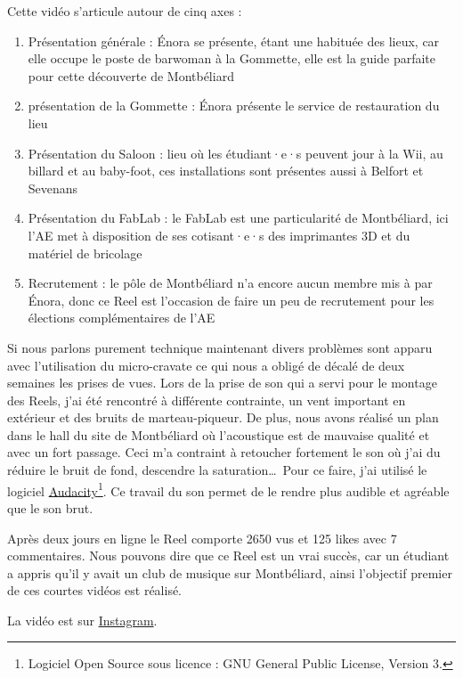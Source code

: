 Cette vidéo s'articule autour de cinq axes :
\begin{enumerate}
    \item Présentation générale : Énora se présente, étant une habituée des lieux, car elle occupe le poste de barwoman à la Gommette, elle est la guide parfaite pour cette découverte de Montbéliard
    \item présentation de la Gommette : Énora présente le service de restauration du lieu
    \item Présentation du Saloon : lieu où les étudiant·e·s peuvent jour à la Wii, au billard et au baby-foot, ces installations sont présentes aussi à Belfort et Sevenans
    \item Présentation du FabLab : le FabLab est une particularité de Montbéliard, ici l'\gls{AE} met à disposition de ses cotisant·e·s des imprimantes 3D et du matériel de bricolage
    \item Recrutement : le pôle de Montbéliard n'a encore aucun membre mis à par Énora, donc ce Reel est l'occasion de faire un peu de recrutement pour les élections complémentaires de l'\gls{AE}
\end{enumerate}


Si nous parlons purement technique maintenant divers problèmes sont apparu avec l'utilisation du micro-cravate ce qui nous a obligé de décalé de deux semaines les prises de vues.
Lors de la prise de son qui a servi pour le montage des Reels, j'ai été rencontré à différente contrainte, un vent important en extérieur et des bruits de marteau-piqueur.
De plus, nous avons réalisé un plan dans le hall du site de Montbéliard où l'acoustique est de mauvaise qualité et avec un fort passage.
Ceci m'a contraint à retoucher fortement le son où j'ai du réduire le bruit de fond, descendre la saturation\ldots\
Pour ce faire, j'ai utilisé le logiciel \href{https://www.audacityteam.org}{Audacity}\footnote{Logiciel Open Source sous licence : GNU General Public License, Version 3.}.
Ce travail du son permet de le rendre plus audible et agréable que le son brut.

Après deux jours en ligne le Reel comporte 2650 vus et 125 likes avec 7 commentaires.
Nous pouvons dire que ce Reel est un vrai succès, car un étudiant a appris qu'il y avait un club de musique sur Montbéliard, ainsi l'objectif premier de ces courtes vidéos est réalisé.

La vidéo est sur \href{https://www.instagram.com/reel/CyEDJKTspWL/?utm_source=ig_web_copy_link&igshid=MzRlODBiNWFlZA==}{Instagram}.



